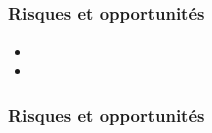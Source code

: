 \speaker{\Pierre}

\subsection{} %


\begin{frame}
\frametitle{Risques et opportunités}
\begin{itemize}
\item 
\item 
\end{itemize}
\end{frame}




\begin{frame}
\frametitle{Risques et opportunités}

\end{frame}




